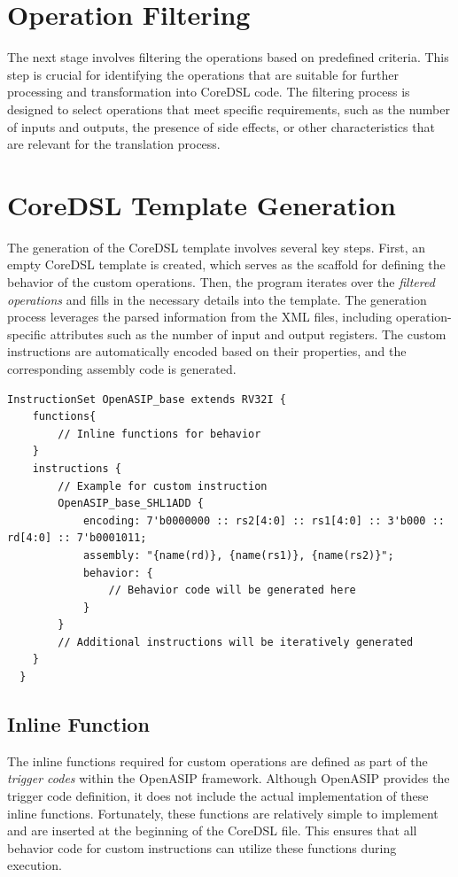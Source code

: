 \section{Operation Filtering}

The next stage involves filtering the operations based on predefined criteria. This step is crucial for identifying the operations that are suitable for further processing and transformation into CoreDSL code. The filtering process is designed to select operations that meet specific requirements, such as the number of inputs and outputs, the presence of side effects, or other characteristics that are relevant for the translation process.

\section{CoreDSL Template Generation}

The generation of the CoreDSL template involves several key steps. First, an empty CoreDSL template is created, which serves as the scaffold for defining the behavior of the custom operations. Then, the program iterates over the \textit{filtered operations} and fills in the necessary details into the template. The generation process leverages the parsed information from the XML files, including operation-specific attributes such as the number of input and output registers. The custom instructions are automatically encoded based on their properties, and the corresponding assembly code is generated.

\begin{lstlisting}[caption={CoreDSL Template},captionpos=b]
  InstructionSet OpenASIP_base extends RV32I {
    functions{
        // Inline functions for behavior
    }
    instructions {
        // Example for custom instruction
        OpenASIP_base_SHL1ADD {
            encoding: 7'b0000000 :: rs2[4:0] :: rs1[4:0] :: 3'b000 :: rd[4:0] :: 7'b0001011;
            assembly: "{name(rd)}, {name(rs1)}, {name(rs2)}";
            behavior: {
                // Behavior code will be generated here
            }
        }
        // Additional instructions will be iteratively generated
    }
  }
\end{lstlisting}

\subsection{Inline Function}

The inline functions required for custom operations are defined as part of the \textit{trigger codes} within the OpenASIP framework. Although OpenASIP provides the trigger code definition, it does not include the actual implementation of these inline functions. Fortunately, these functions are relatively simple to implement and are inserted at the beginning of the CoreDSL file. This ensures that all behavior code for custom instructions can utilize these functions during execution.

